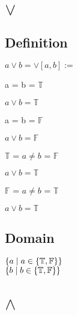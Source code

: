 \documentclass[11pt]{article}
\begin{document}
\section{$\lor$}
\subsection{Definition}
\begin{center}
$
a \lor b = \lor[a,b] :=
$
\end{center}
\vspace{2mm}
a = b = $\mathbb{T}$
\begin{center}
$
a \lor b = \mathbb{T}
$
\end{center}
\vspace{2mm}
a = b = $\mathbb{F}$
\begin{center}
$
a \lor b  = \mathbb{F}
$
\end{center}
\vspace{2mm}
$\mathbb{T}$ = $a \neq b$ = $\mathbb{F}$
\begin{center}
$
a \lor b = \mathbb{T}
$
\end{center}
\vspace{2mm}
$\mathbb{F}$ = $a \neq b$ = $\mathbb{T}$
\begin{center}
$
a \lor b = \mathbb{T}
$
\end{center}
\subsection{Domain}
\begin{center}
$
\{a \hspace{1mm} | \hspace{1mm} a \in \{\mathbb{T},\mathbb{F}\}\}
$
\\ \vspace{2mm}
$
\{b \hspace{1mm} | \hspace{1mm} b \in \{\mathbb{T},\mathbb{F}\}\}
$
\end{center}








\section{$\land$}
\end{document}
